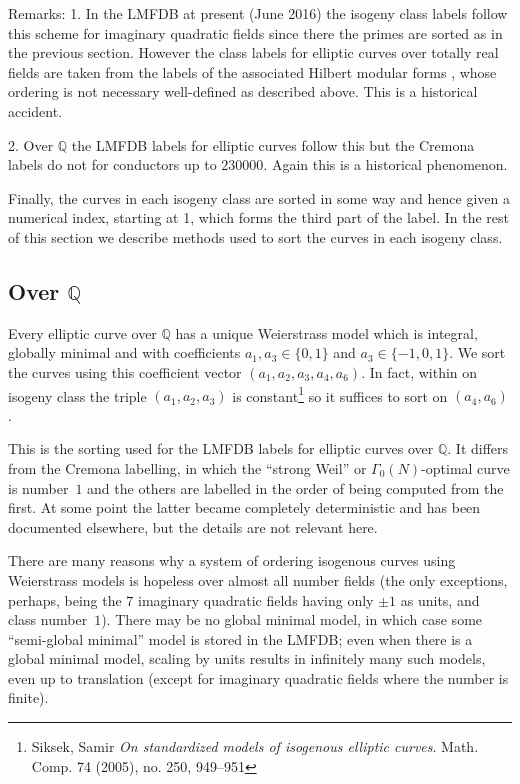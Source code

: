 \documentclass{article}
\def\Q{{\mathbb Q}}
\begin{document}
Remarks: 1. In the LMFDB at present (June 2016) the isogeny class
labels follow this scheme for imaginary quadratic fields since there
the primes are sorted as in the previous section.  However the class
labels for elliptic curves over totally real fields are taken from the
labels of the associated Hilbert modular forms , whose ordering is not
necessary well-defined as described above.  This is a historical
accident.

2. Over $\Q$ the LMFDB labels for elliptic curves follow this but the
Cremona labels do not for conductors up to $230000$.  Again this is a
historical phenomenon.

Finally, the curves in each isogeny class are sorted in some way and
hence given a numerical index, starting at 1, which forms the third
part of the label.  In the rest of this section we describe methods
used to sort the curves in each isogeny class.

\subsection{Over \texorpdfstring{$\Q$}{\bf Q}}

Every elliptic curve over $\Q$ has a unique Weierstrass model which is
integral, globally minimal and with coefficients $a_1,a_3\in\{0,1\}$
and $a_3\in\{-1,0,1\}$.  We sort the curves using this coefficient
vector $(a_1,a_2,a_3,a_4,a_6)$.  In fact, within on isogeny class the
triple $(a_1,a_2,a_3)$ is constant\footnote{Siksek, Samir \textit{On
    standardized models of isogenous elliptic curves}. Math. Comp. 74
  (2005), no. 250, 949–951} so it suffices to sort on $(a_4,a_6)$.

This is the sorting used for the LMFDB labels for elliptic curves over
$\Q$.  It differs from the Cremona labelling, in which the ``strong
Weil'' or $\Gamma_0(N)$-optimal curve is number~$1$ and the others are
labelled in the order of being computed from the first.  At some point
the latter became completely deterministic and has been documented
elsewhere, but the details are not relevant here.

There are many reasons why a system of ordering isogenous curves using
Weierstrass models is hopeless over almost all number fields (the only
exceptions, perhaps, being the $7$ imaginary quadratic fields having
only $\pm1$ as units, and class number~$1$).  There may be no global
minimal model, in which case some ``semi-global minimal'' model is
stored in the LMFDB; even when there is a global minimal model,
scaling by units results in infinitely many such models, even up to
translation (except for imaginary quadratic fields where the number is
finite).
\end{document}
